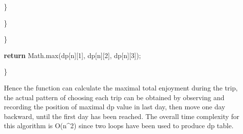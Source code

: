 \documentclass[
]{article}
\newenvironment{Shaded}{}{}
\newcommand{\BuiltInTok}[1]{#1}
\newcommand{\ControlFlowTok}[1]{\textcolor[rgb]{0.00,0.44,0.13}{\textbf{#1}}}
\newcommand{\DecValTok}[1]{\textcolor[rgb]{0.25,0.63,0.44}{#1}}
\newcommand{\FunctionTok}[1]{\textcolor[rgb]{0.02,0.16,0.49}{#1}}
\newcommand{\NormalTok}[1]{#1}
\newcommand{\OperatorTok}[1]{\textcolor[rgb]{0.40,0.40,0.40}{#1}}
\begin{document}
\begin{Shaded}
\begin{Highlighting}[]
            \OperatorTok{\}}

        \OperatorTok{\}}       

    \OperatorTok{\}}

    \ControlFlowTok{return} \BuiltInTok{Math}\OperatorTok{.}\FunctionTok{max}\OperatorTok{(}\NormalTok{dp}\OperatorTok{[}\NormalTok{n}\OperatorTok{][}\DecValTok{1}\OperatorTok{],}\NormalTok{ dp}\OperatorTok{[}\NormalTok{n}\OperatorTok{][}\DecValTok{2}\OperatorTok{],}\NormalTok{ dp}\OperatorTok{[}\NormalTok{n}\OperatorTok{][}\DecValTok{3}\OperatorTok{]);}

\OperatorTok{\}}

\end{Highlighting}
\end{Shaded}

Hence the function can calculate the maximal total enjoyment during the
trip, the actual pattern of choosing each trip can be obtained by
observing and recording the position of maximal dp value in last day,
then move one day backward, until the first day has been reached. The
overall time complexity for this algorithm is O(n\^{}2) since two loops
have been used to produce dp table.
\end{document}
